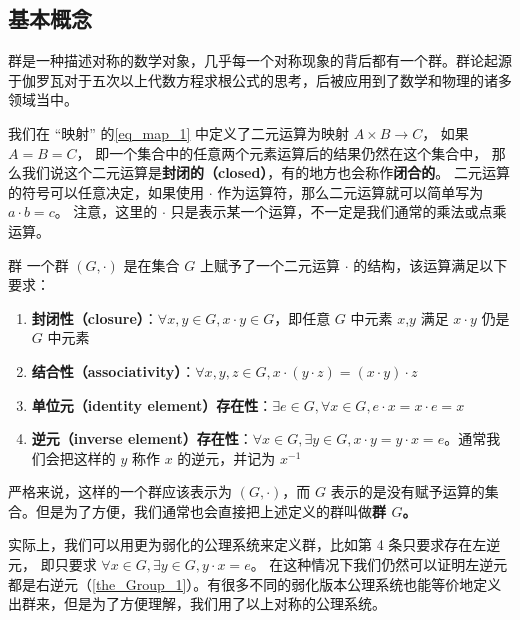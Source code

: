 



\subsection{基本概念}
群是一种描述对称的数学对象，几乎每一个对称现象的背后都有一个群。群论起源于伽罗瓦对于五次以上代数方程求根公式的思考，后被应用到了数学和物理的诸多领域当中。

我们在 “映射” 的\autoref{eq_map_1} 中定义了二元运算为映射 $A \times B \to C$， 如果 $A = B = C$， 即一个集合中的任意两个元素运算后的结果仍然在这个集合中， 那么我们说这个二元运算是\textbf{封闭的（closed）}，有的地方也会称作\textbf{闭合的}。 二元运算的符号可以任意决定，如果使用 $\cdot$ 作为运算符，那么二元运算就可以简单写为 $a \cdot b=c$。 注意，这里的 $\cdot$ 只是表示某一个运算，不一定是我们通常的乘法或点乘运算。

\begin{definition}{群}\label{def_Group_1}
一个群 $(G, \cdot)$ 是在集合 $G$ 上赋予了一个二元运算 $\cdot$ 的结构，该运算满足以下要求：
\begin{enumerate}
\item \textbf{封闭性（closure）}：$\forall x, y\in G, x\cdot y\in G$，即任意 $G$ 中元素 $x$,$y$ 满足 $x\cdot y$ 仍是 $G$ 中元素
\item \textbf{结合性（associativity）}：$\forall x, y, z\in G, x\cdot(y\cdot z)=(x\cdot y)\cdot z$
\item \textbf{单位元（identity element）存在性}：$\exists e\in G, \forall x\in G, e\cdot x=x\cdot e=x$
\item \textbf{逆元（inverse element）存在性}：$\forall x\in G, \exists y\in G, x\cdot y=y\cdot x=e$。通常我们会把这样的 $y$ 称作 $x$ 的逆元，并记为 $x^{-1}$
\end{enumerate}
\end{definition}
严格来说，这样的一个群应该表示为 $(G,\cdot)$，而 $G$ 表示的是没有赋予运算的集合。但是为了方便，我们通常也会直接把上述定义的群叫做\textbf{群 $G$。}

实际上，我们可以用更为弱化的公理系统来定义群，比如第 4 条只要求存在左逆元， 即只要求 $\forall x\in G, \exists y\in G, y\cdot x=e$。 在这种情况下我们仍然可以证明左逆元都是右逆元（\autoref{the_Group_1}）。有很多不同的弱化版本公理系统也能等价地定义出群来，但是为了方便理解，我们用了以上对称的公理系统。

